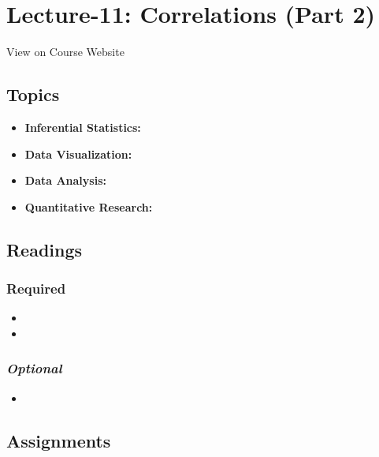 \documentclass[]{book}
\providecommand{\tightlist}{%
  \setlength{\itemsep}{0pt}\setlength{\parskip}{0pt}}
\theoremstyle{definition}
\theoremstyle{definition}
\theoremstyle{definition}
\theoremstyle{remark}
\begin{document}
\section{Lecture-11: Correlations (Part
2)}\label{lecture-11-correlations-part-2}

View on Course Website

\subsection*{Topics}\label{topics-11}

\begin{itemize}
\tightlist
\item
  \textbf{Inferential Statistics:}
\item
  \textbf{Data Visualization:}
\item
  \textbf{Data Analysis:}
\item
  \textbf{Quantitative Research:}
\end{itemize}

\subsection*{Readings}\label{readings-12}

\subsubsection*{Required}\label{required-11}

\begin{itemize}
\item
\item
\end{itemize}

\subsubsection*{\texorpdfstring{\emph{Optional}}{Optional}}\label{optional-11}

\begin{itemize}
\item
\end{itemize}

\subsection*{Assignments}\label{assignments-12}
\end{document}
